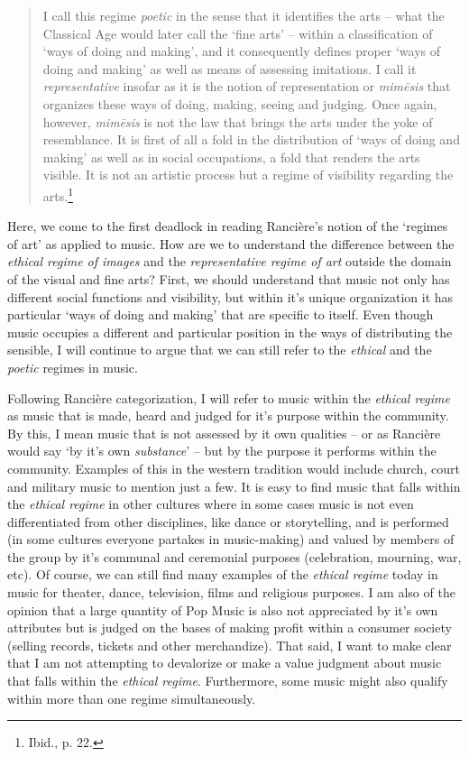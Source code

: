 \begin{quote}
I call this regime \emph{poetic} in the sense that it identifies the arts -- what the Classical Age would later call the `fine arts' -- within a classification of `ways of doing and making', and it consequently defines proper `ways of doing and making' as well as means of assessing imitations. I call it \emph{representative} insofar as it is the notion of representation or \emph{mim\={e}sis} that organizes these ways of doing, making, seeing and judging. Once again, however, \emph{mim\={e}sis} is not the law that brings the arts under the yoke of resemblance. It is first of all a fold in the distribution of `ways of doing and making' as well as in social occupations, a fold that renders the arts visible. It is not an artistic process but a regime of visibility regarding the arts.\footnote{Ibid., p. 22.}
\end{quote}

Here, we come to the first deadlock in reading Ranci\`{e}re's notion of the `regimes of art' as applied to music. How are we to understand the difference between the \emph{ethical regime of images} and the \emph{representative regime of art} outside the domain of the visual and fine arts? First, we should understand that music not only has different social functions and visibility, but within it's unique organization it has particular `ways of doing and making' that are specific to itself. Even though music occupies a different and particular position in the ways of distributing the sensible, I will continue to argue that we can still refer to the \emph{ethical} and the \emph{poetic} regimes in music. 

Following Ranci\`{e}re categorization, I will refer to music within the \emph{ethical regime} as music that is made, heard and judged for it's purpose within the community. By this, I mean music that is not assessed by it own qualities -- or as Ranci\`{e}re would say `by it's own \emph{substance}' -- but by the purpose it performs within the community. Examples of this in the western tradition would include church, court and military music to mention just a few. It is easy to find music that falls within the \emph{ethical regime} in other cultures where in some cases music is not even differentiated from other disciplines, like dance or storytelling, and is performed (in some cultures everyone partakes in music-making) and valued by members of the group by it's communal and ceremonial purposes (celebration, mourning, war, etc). Of course, we can still find many examples of the \emph{ethical regime} today in music for theater, dance, television, films and religious purposes. I am also of the opinion that a large quantity of Pop Music is also not appreciated by it's own attributes but is judged on the bases of making profit within a consumer society (selling records, tickets and other merchandize). That said, I want to make clear that I am not attempting to devalorize or make a value judgment about music that falls within the \emph{ethical regime}. Furthermore, some music might also qualify within more than one regime simultaneously.

